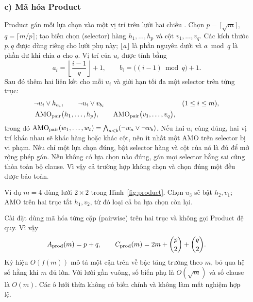 \documentclass[a4paper]{cas-sc}
\newcommand{\AMO}{\operatorname{AMO}}
\begin{document}
\subsubsection*{c) Mã hóa Product}
Product gán mỗi lựa chọn vào một vị trí trên lưới hai chiều \citep{chen2010}. Chọn $p=\lceil\sqrt m\rceil$, $q=\lceil m/p\rceil$; tạo biến chọn (selector) hàng $h_1,\ldots,h_p$ và cột $v_1,\ldots,v_q$. Các kích thước $p,q$ được dùng riêng cho lưới phụ này; $\lfloor a\rfloor$ là phần nguyên dưới và $a\bmod q$ là phần dư khi chia $a$ cho $q$. Vị trí của $u_i$ được tính bằng
\begin{equation}
a_i=\left\lfloor\frac{i-1}{q}\right\rfloor+1,\qquad
b_i=\bigl((i-1)\bmod q\bigr)+1.
\end{equation}
Sau đó thêm hai liên kết cho mỗi $u_i$ và giới hạn tối đa một selector trên từng trục:
\begin{equation}\label{eq:product}
\begin{aligned}
&\neg u_i\lor h_{a_i},\qquad \neg u_i\lor v_{b_i}
&& (1\le i\le m),\\
&\AMO_{\rm pair}\bigl(h_1,\ldots,h_p\bigr),\qquad
\AMO_{\rm pair}\bigl(v_1,\ldots,v_q\bigr),
\end{aligned}
\end{equation}
trong đó $\AMO_{\rm pair}(w_1,\ldots,w_t)=\bigwedge_{a<b}(\neg w_a\lor\neg w_b)$. Nếu hai $u_i$ cùng đúng, hai vị trí khác nhau sẽ khác hàng hoặc khác cột, nên ít nhất một AMO trên selector bị vi phạm. Nếu chỉ một lựa chọn đúng, bật selector hàng và cột của nó là đủ để mở rộng phép gán. Nếu không có lựa chọn nào đúng, gán mọi selector bằng sai cũng thỏa toàn bộ clause. Vì vậy cả trường hợp không chọn và chọn đúng một đều được bảo toàn.

Ví dụ $m=4$ dùng lưới $2\times2$ trong Hình~\ref{fig:product}. Chọn $u_3$ sẽ bật $h_2,v_1$; AMO trên hai trục tắt $h_1,v_2$, từ đó loại cả ba lựa chọn còn lại.
\begin{reportfigure}
\centering
\caption{Mã hóa Product cho bốn lựa chọn. Mỗi biến chính liên kết với selector hàng và cột; ví dụ tô màu minh họa khi $u_3$ được chọn.}
\label{fig:product}
\end{reportfigure}
Cài đặt dùng mã hóa từng cặp (pairwise) trên hai trục và không gọi Product đệ quy. Vì vậy
\begin{equation}\label{eq:productcount}
A_{\rm prod}(m)=p+q,\qquad
C_{\rm prod}(m)=2m+\binom p2+\binom q2.
\end{equation}
Ký hiệu $O(f(m))$ mô tả một cận trên về bậc tăng trưởng theo $m$, bỏ qua hệ số hằng khi $m$ đủ lớn. Với lưới gần vuông, số biến phụ là $O(\sqrt m)$ và số clause là $O(m)$. Các ô lưới thừa không có biến chính và không làm mất nghiệm hợp lệ.
\end{document}
